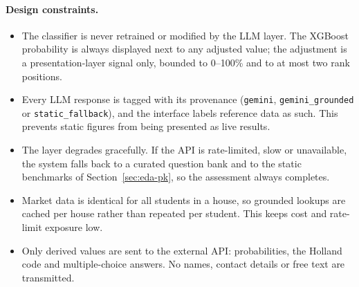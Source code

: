 \paragraph{Design constraints.}
\begin{itemize}
  \item The classifier is never retrained or modified by the LLM layer. The
        XGBoost probability is always displayed next to any adjusted value;
        the adjustment is a presentation-layer signal only, bounded to
        0--100\% and to at most two rank positions.
  \item Every LLM response is tagged with its provenance
        (\texttt{gemini}, \texttt{gemini\_\allowbreak grounded} or
        \texttt{static\_\allowbreak fallback}), and the interface labels reference data
        as such. This prevents static figures from being presented as live
        results.
  \item The layer degrades gracefully. If the API is rate-limited, slow or
        unavailable, the system falls back to a curated question bank and to
        the static benchmarks of Section~\ref{sec:eda-pk}, so the assessment
        always completes.
  \item Market data is identical for all students in a house, so grounded
        lookups are cached per house rather than repeated per student. This
        keeps cost and rate-limit exposure low.
  \item Only derived values are sent to the external API: probabilities, the
        Holland code and multiple-choice answers. No names, contact details
        or free text are transmitted.
\end{itemize}

